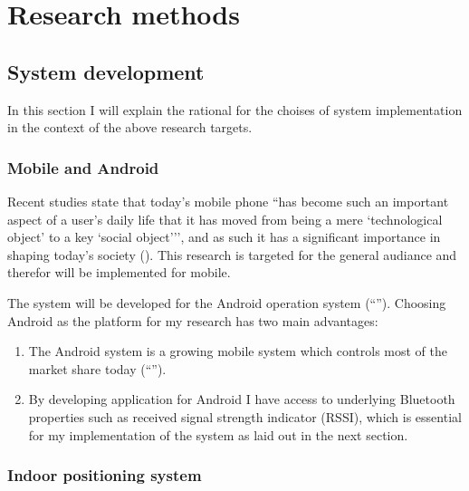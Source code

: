 \section{Research methods}


\subsection{System development}

In this section I will explain the rational for the choises of system implementation in the context of the above research targets.

\subsubsection{Mobile and Android}


Recent studies state that today's mobile phone ``has become such an important aspect of a user's daily life that it has moved from being a mere `technological object' to a key `social object{'}'', and as such it has a significant importance in shaping today's society (\cite{srivastava05}).
This research is targeted for the general audiance and therefor will be implemented for mobile.

The system will be developed for the Android operation system (``'').
Choosing Android as the platform for my research has two main advantages:
\begin{enumerate}
	\item The Android system is a growing mobile system which controls most of the market share today (``'').
	\item By developing application for Android I have access to underlying Bluetooth properties such as received signal strength indicator (RSSI), which is essential for my implementation of the system as laid out in the next section.
\end{enumerate}

\subsubsection{Indoor positioning system}\label{methods:ips}

